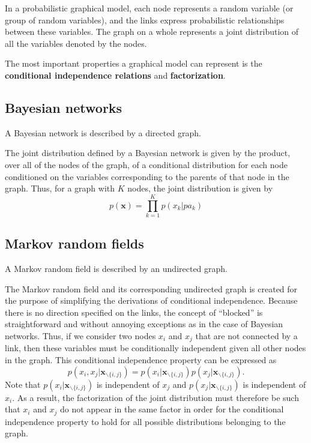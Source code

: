 \documentclass[a4paper]{report}
\renewcommand{\bf}{\mathbf}
\begin{document}
In a probabilistic graphical model, each node represents a random variable (or group of random variables), and the links express probabilistic relationships between these variables. The graph on a whole represents a joint distribution of all the variables denoted by the nodes.

The most important properties a graphical model can represent is the \textbf{conditional independence relations} and \textbf{factorization}.
\subsection{Bayesian networks}
A Bayesian network is described by a directed graph.

The joint distribution defined by a Bayesian network is given by the product, over all of the nodes of the graph, of a conditional distribution for each node conditioned on the variables corresponding to the parents of that node in the graph. Thus, for a graph with $K$ nodes, the joint distribution is given by
\begin{equation}
	p(\bf{x}) = \prod_{k=1}^K p(x_k|pa_k)
\end{equation}
\subsection{Markov random fields}
A Markov random field is described by an undirected graph.

The Markov random field and its corresponding undirected graph is created for the purpose of simplifying the derivations of conditional independence. Because there is no direction specified on the links, the concept of ``blocked'' is straightforward and without annoying exceptions as in the case of Bayesian networks. Thus, if we consider two nodes $x_i$ and $x_j$ that are not connected by a link, then these variables must be conditionally independent given all other nodes in the graph. This conditional independence property can be expressed as
\begin{equation}
	p(x_i,x_j|\bf{x}_{\backslash \{i,j\}}) = p(x_i|\bf{x}_{\backslash\{i,j\}}) p(x_j|\bf{x}_{\backslash
	\{i,j\}}).
\end{equation}
Note that $p(x_i|\bf{x}_{\backslash\{i,j\}})$ is independent of $x_j$ and $p(x_j|\bf{x}_{\backslash
	\{i,j\}})$ is independent of $x_i$. As a result, the factorization of the joint distribution must therefore be such that $x_i$ and $x_j$ do not appear in the same factor in order for the conditional independence property to hold for all possible distributions belonging to the graph.
\end{document}
